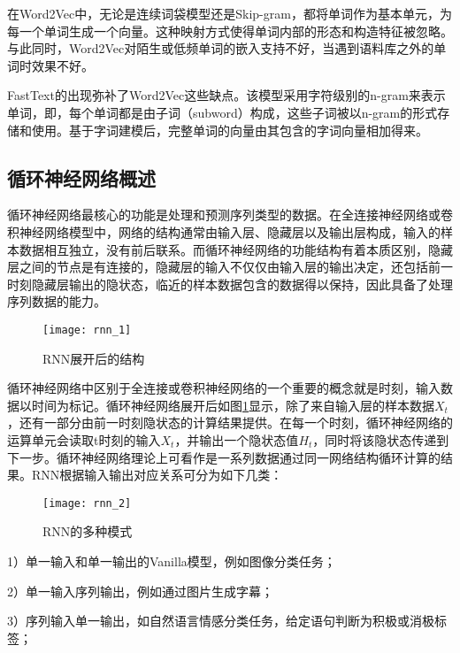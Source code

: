 在Word2Vec中，无论是连续词袋模型还是Skip-gram，都将单词作为基本单元，为每一个单词生成一个向量。这种映射方式使得单词内部的形态和构造特征被忽略。与此同时，Word2Vec对陌生或低频单词的嵌入支持不好，当遇到语料库之外的单词时效果不好。

FastText的出现弥补了Word2Vec这些缺点。该模型采用字符级别的n-gram来表示单词，即，每个单词都是由子词（subword）构成，这些子词被以n-gram的形式存储和使用。基于字词建模后，完整单词的向量由其包含的字词向量相加得来。


\subsection{循环神经网络概述}

循环神经网络最核心的功能是处理和预测序列类型的数据。在全连接神经网络或卷积神经网络模型中，网络的结构通常由输入层、隐藏层以及输出层构成，输入的样本数据相互独立，没有前后联系。而循环神经网络的功能结构有着本质区别，隐藏层之间的节点是有连接的，隐藏层的输入不仅仅由输入层的输出决定，还包括前一时刻隐藏层输出的隐状态，临近的样本数据包含的数据得以保持，因此具备了处理序列数据的能力。

\begin{figure}[htp]
\centering
\texttt{[image: rnn\_1]}
\caption{RNN展开后的结构}
\label{fig:rnn_1}
\end{figure}
循环神经网络中区别于全连接或卷积神经网络的一个重要的概念就是时刻，输入数据以时间为标记。循环神经网络展开后如图\ref{fig:rnn_1}显示，除了来自输入层的样本数据$X_t$，还有一部分由前一时刻隐状态的计算结果提供。在每一个时刻，循环神经网络的运算单元会读取t时刻的输入$X_t$，并输出一个隐状态值$H_t$，同时将该隐状态传递到下一步。循环神经网络理论上可看作是一系列数据通过同一网络结构循环计算的结果。RNN根据输入输出对应关系可分为如下几类：

\begin{figure}[htp]
\centering
\texttt{[image: rnn\_2]}
\caption{RNN的多种模式}
\label{fig:rnn_2}
\end{figure}

1）单一输入和单一输出的Vanilla模型，例如图像分类任务；

2）单一输入序列输出，例如通过图片生成字幕；

3）序列输入单一输出，如自然语言情感分类任务，给定语句判断为积极或消极标签；

